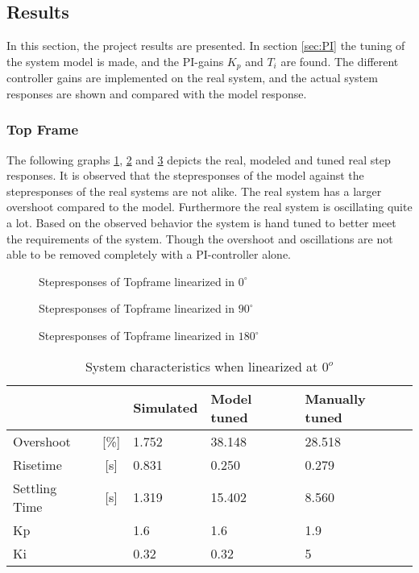 \documentclass[../../Main]{subfiles}
\begin{document}
\subsection{Results}
\label{sec:results}
In this section, the project results are presented. In section \ref{sec:PI} the tuning of the system model is made, and the PI-gains $K_p$ and $T_i$ are found. The different controller gains are implemented on the real system, and the actual system responses are shown and compared
with the model response.

\subsubsection{Top Frame}
\label{sec:top_frame_results}

The following graphs \ref{fig:top_0}, \ref{fig:top_90} and \ref{fig:top_180} depicts the real, modeled and tuned real step responses.
It is observed that the stepresponses of the model against the stepresponses of the real
systems are not alike. The real system has a larger overshoot compared to the model.
Furthermore the real system is oscillating quite a lot. Based on the observed behavior
the system is hand tuned to better meet the requirements of the system. Though the
overshoot and oscillations are not able to be removed completely with a PI-controller
alone.


\begin{figure}[H]
  \def\svgwidth{\textwidth}
  
  \caption{Stepresponses of Topframe linearized in $0^{\circ}$}
  \label{fig:top_0}
\end{figure}


\begin{figure}[H]	
  \def\svgwidth{\textwidth}
  
  \caption{Stepresponses of Topframe linearized in $90^{\circ}$}
  \label{fig:top_90}
\end{figure}

\begin{figure}[H]
  \def\svgwidth{\textwidth}
  
  \caption{Stepresponses of Topframe linearized in $180^{\circ}$}
  \label{fig:top_180}
\end{figure}



\begin{table}[H]
	\centering
	\begin{tabular}{lc|*{3}{l}}
		&&Simulated&Model tuned&Manually tuned\\
		\hline
		Overshoot&[\%] &1.752&38.148&28.518\\
		Risetime&[\si{s}]&0.831&0.250&0.279\\
		Settling Time&[\si{s}]&1.319&15.402&8.560\\
		Kp&&1.6&1.6&1.9\\
		Ki&&0.32&0.32&5
	\end{tabular}
	\caption{System characteristics when linearized at $0^o$}
	\label{tab:0_top}
\end{table}
\end{document}
